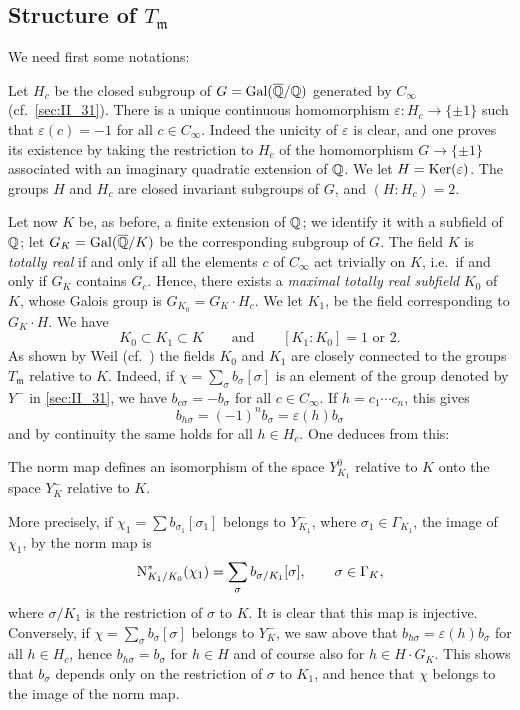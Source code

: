 \subsection{Structure of \texorpdfstring{$T_{\mathfrak{m}}$}{Tm}}
We need first some notations:

Let $H_c$ be the closed subgroup of $G = \operatorname{Gal}(\overline{\mathbb{Q}}/\mathbb{Q})$ generated by
$C_\infty$ (cf.\ \ref{sec:II_31}). There is a unique continuous homomorphism
\dpage
$\varepsilon \colon H_c \to \{ \pm 1 \}$ such that $\varepsilon(c) = -1$ for
all $c \in C_\infty$. Indeed the unicity of $\varepsilon$ is clear, and one
proves its existence by taking the restriction to $H_c$ of the homomorphism $G
\to \{ \pm 1 \}$ associated with an imaginary quadratic extension of $\mathbb{Q}$. We
let $H = \operatorname{Ker}(\varepsilon)$. The groups $H$ and $H_c$ are closed invariant
subgroups of $G$, and $(H: H_c) = 2$.

Let now $K$ be, as before, a finite extension of $\mathbb{Q}$; we identify
it with a subfield of $\mathbb{Q}$; let $G_K = \operatorname{Gal}(\overline{\mathbb{Q}}/K)$ be the corresponding
subgroup of $G$. The field $K$ is \emph{totally real} if and only if all the
elements $c$ of $C_\infty$ act trivially on $K$, i.e.\ if and only if $G_K$
contains $G_c$. Hence, there exists a \emph{maximal totally real subfield}
$K_0$ of $K$, whose Galois group is $G_{K_0} = G_K \cdot H_c$. We let $K_1$, be
the field corresponding to $G_K \cdot H$. We have
\[
	K_0 \subset K_1 \subset K \qquad \text{and} \qquad
	[K_1 : K_0] = 1 \text{ or } 2.
\]
As shown by Weil (cf.\ \cite[4]{47}) the fields $K_0$ and $K_1$ are closely
connected to the groups $T_{\mathfrak{m}}$ relative to $K$. Indeed, if $\chi =
\sum_{\sigma} b_\sigma[\sigma]$ is an element of the group denoted by $Y^-$ in
\ref{sec:II_31}, we have $b_{c\sigma} = -b_\sigma$ for all $c \in C_\infty$. If
$h = c_1 \cdots c_n$, this gives
\[
	b_{h\sigma} = (-1)^n b_\sigma = \varepsilon(h) b_\sigma
\]
and by continuity the same holds for all $h \in H_c$. One deduces from this:

\begin{prop}
	The norm map defines an isomorphism of the space $Y_{K_1}^0$ relative
	to $K$ onto the space $Y_K^-$ relative to $K$.
\end{prop}

More precisely, if $\chi_1 = \sum b_{\sigma_1}[\sigma_1]$ belongs to
\dpage
$Y_{K_1}^-$, where $\sigma_1 \in \Gamma_{K_1}$, the image of $\chi_1$, by the
norm map is
\[
	\operatorname{N}_{K_1/K_0}^*(\chi_1) = \sum_{\sigma} b_{\sigma/K_1}[\sigma], \qquad
	\sigma \in \Gamma_K,
\]
where $\sigma/K_1$ is the restriction of $\sigma$ to $K$. It is clear that this
map is injective. Conversely, if $\chi = \sum_{\sigma} b_\sigma[\sigma]$
belongs to $Y_K^-$, we saw above that $b_{h\sigma} = \varepsilon(h)b_\sigma$
for all $h \in H_c$, hence $b_{h \sigma} = b_\sigma$ for $h \in H$ and of
course also for $h \in H\cdot G_K$. This shows that $b_\sigma$ depends only on
the restriction of $\sigma$ to $K_1$, and hence that $\chi$ belongs to the
image of the norm map.

